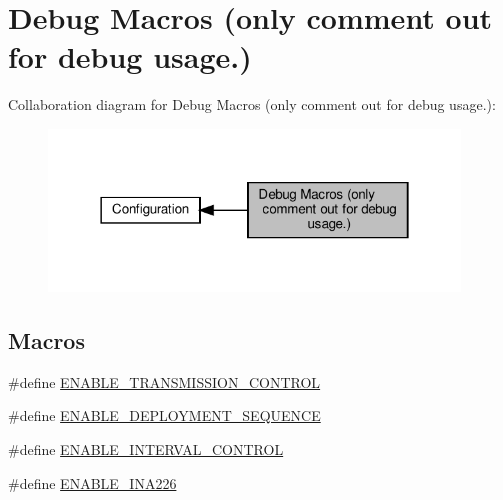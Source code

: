 \hypertarget{group__defines__debug__macros}{}\section{Debug Macros (only comment out for debug usage.)}
\label{group__defines__debug__macros}
Collaboration diagram for Debug Macros (only comment out for debug usage.)\+:
\nopagebreak
\begin{figure}[H]
\begin{center}
\leavevmode
\includegraphics[width=310pt]{group__defines__debug__macros}
\end{center}
\end{figure}
\subsection*{Macros}
\begin{DoxyCompactItemize}
\item 
\#define \hyperlink{group__defines__debug__macros_ga9540d97eef375819a92593f0e9a7a1f6}{E\+N\+A\+B\+L\+E\+\_\+\+T\+R\+A\+N\+S\+M\+I\+S\+S\+I\+O\+N\+\_\+\+C\+O\+N\+T\+R\+OL}
\item 
\#define \hyperlink{group__defines__debug__macros_ga0a56ed473e6b28f5f47a91daad56691b}{E\+N\+A\+B\+L\+E\+\_\+\+D\+E\+P\+L\+O\+Y\+M\+E\+N\+T\+\_\+\+S\+E\+Q\+U\+E\+N\+CE}
\item 
\#define \hyperlink{group__defines__debug__macros_ga0fe0251d8d01ab2080467443b07af5de}{E\+N\+A\+B\+L\+E\+\_\+\+I\+N\+T\+E\+R\+V\+A\+L\+\_\+\+C\+O\+N\+T\+R\+OL}
\item 
\#define \hyperlink{group__defines__debug__macros_ga87db321802eb0b214234ee6936607fe3}{E\+N\+A\+B\+L\+E\+\_\+\+I\+N\+A226}
\end{DoxyCompactItemize}


